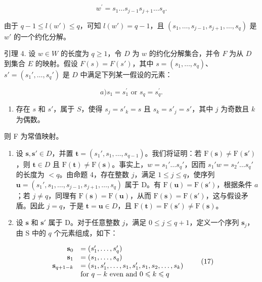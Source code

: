 \[
w ^ {\prime} = s _ {1} \dots s _ {j - 1} s _ {j + 1} \dots s _ {q}.
\]

由于 \(q - 1 \leqslant l(w') \leqslant q\)，可知 \(l(w') = q - 1\)，且 \((s_1, \ldots, s_{j-1}, s_{j+1}, \ldots, s_q)\) 是 \(w'\) 的一个约化分解。

引理 4. 设 \(w \in W\) 的长度为 \(q \geqslant 1\)，令 \(D\) 为 \(w\) 的约化分解集合，并令 \(F\) 为从 \(D\) 到集合 \(E\) 的映射。假设 \(F(s) = F(s')\)，其中 \(s = (s_1, \ldots, s_q)\)、\(s' = (s_1', \ldots, s_q')\) 是 \(D\) 中满足下列某一假设的元素：

\[
a) s _ {1} = s _ {1} ^ {\prime} \text {   or   } s _ {q} = s _ {q} ^ {\prime}.
\]

\begin{enumerate}
\def\labelenumi{\alph{enumi})}
\setcounter{enumi}{1}
\tightlist
\item
  存在 \(s\) 和 \(s'\)，属于 \(S\)，使得 \(s_j = s'_k = s\) 且 \(s_k = s'_j = s'\)，其中 \(j\) 为奇数且 \(k\) 为偶数。
\end{enumerate}

则 F 为常值映射。

\begin{enumerate}
\def\labelenumi{\Alph{enumi})}
\item
  设 \(\mathbf{s}, \mathbf{s}' \in D\)，并置 \(\mathbf{t} = (s_1', s_1, \ldots, s_{q-1})\)。我们将证明：若 \(\mathrm{F}(\mathbf{s}) \neq \mathrm{F}(\mathbf{s}')\)，则 \(\mathbf{t} \in D\) 且 \(\mathrm{F}(\mathbf{t}) \neq \mathrm{F}(\mathbf{s})\)。事实上，\(w = s_1' \ldots s_q'\)，因而 \(s_1' w = s_2' \ldots s_q'\) 的长度为 \(< q\)。由命题 4，存在整数 \(j\)，满足 \(1 \leqslant j \leqslant q\)，使序列 \(\mathbf{u} = (s_1', s_1, \ldots, s_{j-1}, s_{j+1}, \ldots, s_q)\) 属于 D。有 \(\mathrm{F}(\mathbf{u}) = \mathrm{F}(\mathbf{s}')\)，根据条件 \(a\)；若 \(j \neq q\)，同理有 \(\mathrm{F}(\mathbf{s}) = \mathrm{F}(\mathbf{u})\)，从而 \(\mathrm{F}(\mathbf{s}) = \mathrm{F}(\mathbf{s}')\)，这与假设矛盾。因此 \(j = q\)，于是 \(\mathbf{t} = \mathbf{u} \in D\)，且 \(\mathrm{F}(\mathbf{t}) = \mathrm{F}(\mathbf{s}') \neq \mathrm{F}(\mathbf{s})\)。
\item
  设 \(\mathbf{s}\) 和 \(\mathbf{s}'\) 属于 D。对于任意整数 \(j\)，满足 \(0 \leqslant j \leqslant q + 1\)，定义一个序列 \(\mathbf{s}_j\)，由 S 中的 \(q\) 个元素组成，如下：
\end{enumerate}

\[
\begin{array}{r l} \mathbf {s} _ {0} & = (s _ {1} ^ {\prime}, \dots , s _ {q} ^ {\prime}) \\ \mathbf {s} _ {1} & = (s _ {1}, \dots , s _ {q}) \\ \mathbf {s} _ {q + 1 - k} & = (s _ {1}, s _ {1} ^ {\prime}, \dots , s _ {1}, s _ {1} ^ {\prime}, s _ {1}, s _ {2}, \dots , s _ {k}) \\ & \text {for } q - k \text { even and } 0 \leqslant k \leqslant q \end{array}\tag{17}
\]

